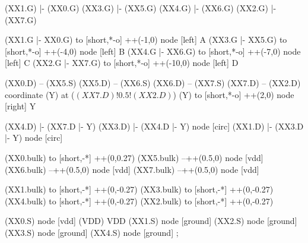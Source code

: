 \begin{circuitikz}[american]

	(XX1.G) |- (XX0.G)
	(XX3.G) |- (XX5.G)
	(XX4.G) |- (XX6.G)
	(XX2.G) |- (XX7.G)
	
	(XX1.G |- XX0.G) to [short,*-o] ++(-1,0) node [left] {A}
	(XX3.G |- XX5.G) to [short,*-o] ++(-4,0) node [left] {B}
	(XX4.G |- XX6.G) to [short,*-o] ++(-7,0) node [left] {C}
	(XX2.G |- XX7.G) to [short,*-o] ++(-10,0) node [left] {D}
	
	(XX0.D) -- (XX5.S)
	(XX5.D) -- (XX6.S)
	(XX6.D) -- (XX7.S)
	(XX7.D) -- (XX2.D)
	coordinate (Y) at ($(XX7.D)!0.5!(XX2.D)$)
	(Y) to [short,*-o] ++(2,0) node [right] {Y}
	
	(XX4.D) |- (XX7.D |- Y)
	(XX3.D) |- (XX4.D |- Y) node [circ] {}
	(XX1.D) |- (XX3.D |- Y) node [circ] {}
	
	(XX0.bulk) to [short,-*] ++(0,0.27)
	(XX5.bulk) --++(0.5,0) node [vdd] {}
	(XX6.bulk) --++(0.5,0) node [vdd] {}
	(XX7.bulk) --++(0.5,0) node [vdd] {}
	
	(XX1.bulk) to [short,-*] ++(0,-0.27)
	(XX3.bulk) to [short,-*] ++(0,-0.27)
	(XX4.bulk) to [short,-*] ++(0,-0.27)
	(XX2.bulk) to [short,-*] ++(0,-0.27)


	(XX0.S) node [vdd] (VDD) {VDD}
	(XX1.S) node [ground] {}
	(XX2.S) node [ground] {}
	(XX3.S) node [ground] {}
	(XX4.S) node [ground] {}
;

\end{circuitikz}
